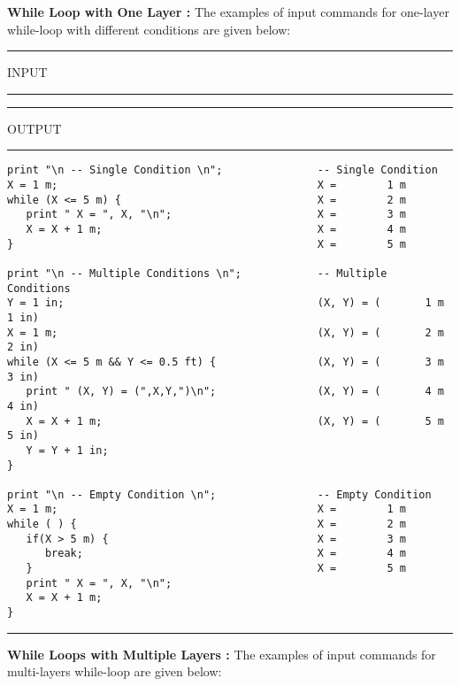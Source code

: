 \vspace{0.15 in}\noindent
{\bf While Loop with One Layer :}
The examples of input commands for one-layer
while-loop with different conditions are given below:

\vspace{0.15 in}
\begin{footnotesize}
\noindent
\rule{1.2 in}{0.035 in} INPUT \rule{1.2 in}{0.035 in}\hspace{0.1 in}
\rule{1.3 in}{0.035 in} OUTPUT\rule{1.3 in}{0.035 in}
\begin{verbatim}
print "\n -- Single Condition \n";               -- Single Condition
X = 1 m;                                         X =        1 m
while (X <= 5 m) {                               X =        2 m
   print " X = ", X, "\n";                       X =        3 m
   X = X + 1 m;                                  X =        4 m
}                                                X =        5 m

print "\n -- Multiple Conditions \n";            -- Multiple Conditions 
Y = 1 in;                                        (X, Y) = (       1 m       1 in)
X = 1 m;                                         (X, Y) = (       2 m       2 in)
while (X <= 5 m && Y <= 0.5 ft) {                (X, Y) = (       3 m       3 in)
   print " (X, Y) = (",X,Y,")\n";                (X, Y) = (       4 m       4 in)
   X = X + 1 m;                                  (X, Y) = (       5 m       5 in)
   Y = Y + 1 in;
}

print "\n -- Empty Condition \n";                -- Empty Condition
X = 1 m;                                         X =        1 m
while ( ) {                                      X =        2 m
   if(X > 5 m) {                                 X =        3 m
      break;                                     X =        4 m
   }                                             X =        5 m
   print " X = ", X, "\n";
   X = X + 1 m;
}
\end{verbatim}
\rule{6.25 in}{0.035 in}
\end{footnotesize}

\vspace{0.25 in}\noindent
{\bf While Loops with Multiple Layers :}
The examples of input commands for multi-layers while-loop
are given below:


